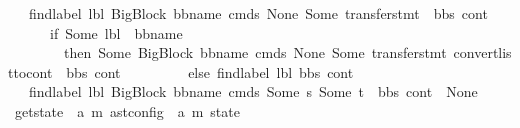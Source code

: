 \begin{isabellebody}
\ \ {\isacharbar}{\kern0pt}\ {\isachardoublequoteopen}find{\isacharunderscore}{\kern0pt}label\ lbl\ {\isacharparenleft}{\kern0pt}{\isacharparenleft}{\kern0pt}BigBlock\ bb{\isacharunderscore}{\kern0pt}name\ cmds\ None\ {\isacharparenleft}{\kern0pt}Some\ transfer{\isacharunderscore}{\kern0pt}stmt{\isacharparenright}{\kern0pt}{\isacharparenright}{\kern0pt}\ {\isacharhash}{\kern0pt}\ bbs{\isacharparenright}{\kern0pt}\ cont\ {\isacharequal}{\kern0pt}\ \isanewline
\ \ \ \ \ \ {\isacharparenleft}{\kern0pt}if\ {\isacharparenleft}{\kern0pt}Some\ lbl\ {\isacharequal}{\kern0pt}\ bb{\isacharunderscore}{\kern0pt}name{\isacharparenright}{\kern0pt}\ \isanewline
\ \ \ \ \ \ \ \ then\ {\isacharparenleft}{\kern0pt}Some\ {\isacharparenleft}{\kern0pt}{\isacharparenleft}{\kern0pt}BigBlock\ bb{\isacharunderscore}{\kern0pt}name\ cmds\ None\ {\isacharparenleft}{\kern0pt}Some\ transfer{\isacharunderscore}{\kern0pt}stmt{\isacharparenright}{\kern0pt}{\isacharparenright}{\kern0pt}{\isacharcomma}{\kern0pt}\ {\isacharparenleft}{\kern0pt}convert{\isacharunderscore}{\kern0pt}list{\isacharunderscore}{\kern0pt}to{\isacharunderscore}{\kern0pt}cont\ {\isacharparenleft}{\kern0pt}\ bbs{\isacharparenright}{\kern0pt}\ cont{\isacharparenright}{\kern0pt}{\isacharparenright}{\kern0pt}{\isacharparenright}{\kern0pt}\ \isanewline
\ \ \ \ \ \ \ \ else\ {\isacharparenleft}{\kern0pt}find{\isacharunderscore}{\kern0pt}label\ lbl\ bbs\ cont{\isacharparenright}{\kern0pt}{\isacharparenright}{\kern0pt}{\isachardoublequoteclose}\isanewline
\ \ {\isacharbar}{\kern0pt}\ {\isachardoublequoteopen}find{\isacharunderscore}{\kern0pt}label\ lbl\ {\isacharparenleft}{\kern0pt}{\isacharparenleft}{\kern0pt}BigBlock\ bb{\isacharunderscore}{\kern0pt}name\ cmds\ {\isacharparenleft}{\kern0pt}Some\ s{\isacharparenright}{\kern0pt}\ {\isacharparenleft}{\kern0pt}Some\ t{\isacharparenright}{\kern0pt}{\isacharparenright}{\kern0pt}\ {\isacharhash}{\kern0pt}\ bbs{\isacharparenright}{\kern0pt}\ cont\ {\isacharequal}{\kern0pt}\ None{\isachardoublequoteclose}\isanewline
\isanewline
{}\isamarkupfalse%
\ get{\isacharunderscore}{\kern0pt}state\ {\isacharcolon}{\kern0pt}{\isacharcolon}{\kern0pt}\ {\isachardoublequoteopen}{\isacharparenleft}{\kern0pt}{\isacharprime}{\kern0pt}a{\isacharcomma}{\kern0pt}\ {\isacharprime}{\kern0pt}m{\isacharparenright}{\kern0pt}\ ast{\isacharunderscore}{\kern0pt}config\ {\isasymRightarrow}\ {\isacharparenleft}{\kern0pt}{\isacharprime}{\kern0pt}a{\isacharcomma}{\kern0pt}\ {\isacharprime}{\kern0pt}m{\isacharparenright}{\kern0pt}\ state{\isachardoublequoteclose}\isanewline
\ \ \isanewline

\end{isabellebody}
